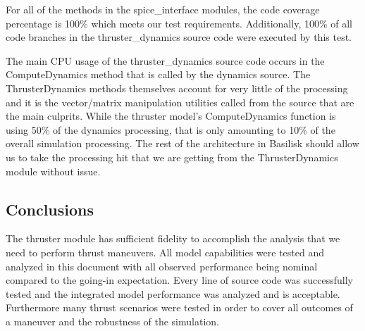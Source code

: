 For all of the methods in the spice\_interface modules, the code coverage
percentage is 100\% which meets our test requirements.  Additionally, 100\% of
all code branches in the thruster\_dynamics source code were executed by this
test.


The main CPU usage of the thruster\_dynamics source code occurs in the
ComputeDynamics method that is called by the dynamics source.  The
ThrusterDynamics methods themselves account for very little of the processing
and it is the vector/matrix manipulation utilities called from the source that
are the main culprits.  While the thruster model's ComputeDynamics function is
using 50\% of the dynamics processing, that is only amounting to 10\% of the
overall simulation processing.  The rest of the architecture in Basilisk should
allow us to take the processing hit that we are getting from the
ThrusterDynamics module without issue.

\subsection{Conclusions}
The thruster module has sufficient fidelity to accomplish the analysis
that we need to perform thrust maneuvers.  All model capabilities were
tested and analyzed in this document with all observed performance being nominal
compared to the going-in expectation. Every line of source code was successfully tested and the integrated model
performance was analyzed and is acceptable. Furthermore many thrust scenarios were tested in order to cover all outcomes of a maneuver and the robustness of the simulation.
